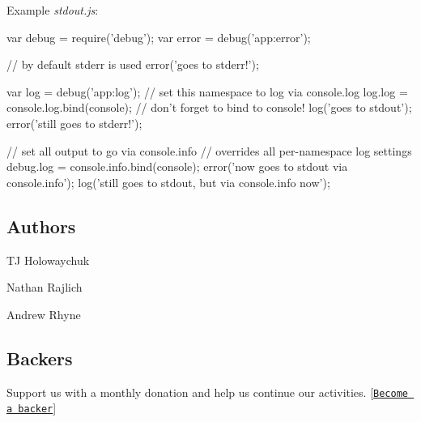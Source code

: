 Example {\itshape stdout.\+js}\+:


\begin{DoxyCode}
var debug = require('debug');
var error = debug('app:error');

// by default stderr is used
error('goes to stderr!');

var log = debug('app:log');
// set this namespace to log via console.log
log.log = console.log.bind(console); // don't forget to bind to console!
log('goes to stdout');
error('still goes to stderr!');

// set all output to go via console.info
// overrides all per-namespace log settings
debug.log = console.info.bind(console);
error('now goes to stdout via console.info');
log('still goes to stdout, but via console.info now');
\end{DoxyCode}


\subsection*{Authors}


\begin{DoxyItemize}
\item TJ Holowaychuk
\item Nathan Rajlich
\item Andrew Rhyne
\end{DoxyItemize}

\subsection*{Backers}

Support us with a monthly donation and help us continue our activities. \mbox{[}\href{https://opencollective.com/debug#backer}{\tt Become a backer}\mbox{]}


